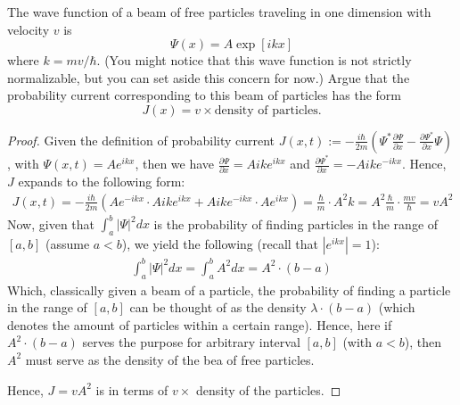 \documentclass{article}
\begin{document}
\newpage

\begin{ques}\label{q5}
The wave function of a beam of free particles traveling in one dimension with velocity $v$ is
\[
\Psi(x) = A \exp [ikx]
\]
where $k = mv/\hbar$. (You might notice that this wave function is not strictly normalizable, but
you can set aside this concern for now.) Argue that the probability current corresponding
to this beam of particles has the form
\[
J(x) = v \times \text{density of particles}.
\]
\end{ques}

\begin{proof}
    Given the definition of probability current $J(x,t):=-\frac{i\hbar}{2m}\left(\Psi^*\frac{\partial \Psi}{\partial x}-\frac{\partial \Psi^*}{\partial x}\Psi\right)$, with $\Psi(x,t)=Ae^{ikx}$, then we have $\frac{\partial \Psi}{\partial x}=Aike^{ikx}$ and $\frac{\partial \Psi^*}{\partial x}=-Aike^{-ikx}$. Hence, $J$ expands to the following form:
    \begin{align}
        J(x,t)=-\frac{i\hbar}{2m}\left(Ae^{-ikx}\cdot Aike^{ikx}+Aike^{-ikx}\cdot Ae^{ikx}\right) = \frac{\hbar}{m}\cdot A^2k=A^2\frac{\hbar}{m}\cdot \frac{mv}{\hbar} = vA^2
    \end{align}
    Now, given that $\int_{a}^{b}|\Psi|^2dx$ is the probability of finding particles in the range of $[a,b]$ (assume $a<b$), we yield the following (recall that $|e^{ikx}|=1$):
    \begin{align}
        \int_{a}^{b}|\Psi|^2 dx=\int_{a}^{b}A^2 dx = A^2\cdot (b-a)
    \end{align}
    Which, classically given a beam of a particle, the probability of finding a particle in the range of $[a,b]$ can be thought of as the density $\lambda \cdot (b-a)$ (which denotes the amount of particles within a certain range). Hence, here if $A^2\cdot (b-a)$ serves the purpose for arbitrary interval $[a,b]$ (with $a<b$), then $A^2$ must serve as the density of the bea of free particles.

    Hence, $J = vA^2$ is in terms of $v \times $ density of the particles.

\end{proof}

\hfil
\end{document}
